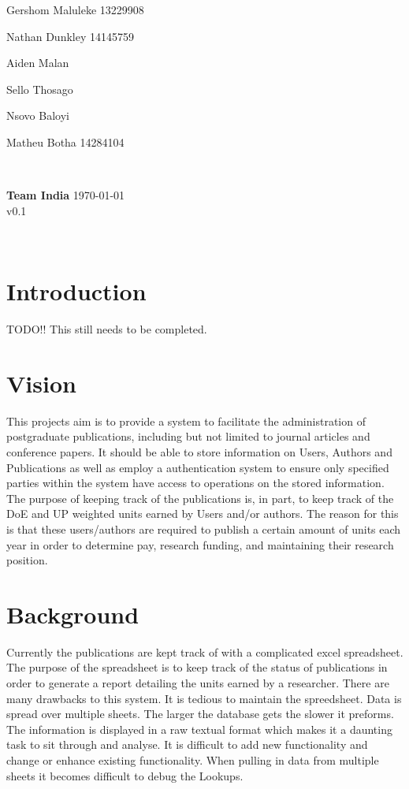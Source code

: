 \documentclass{article}
\begin{document}
\begin{titlepage}
\begin{minipage}{0.5\textwidth}
\begin{flushleft}
	Gershom Maluleke 13229908


	Nathan Dunkley 14145759

	Aiden Malan

	Sello Thosago

	Nsovo Baloyi

	Matheu Botha 14284104
	\end{flushleft}
	\end{minipage}
	~
	\begin{minipage}{0.4\textwidth}
	\begin{flushright} \large
	{ \huge \bfseries Team India }%
	{\large \today}\\
	{\large v0.1}
	\end{flushright}
	\end{minipage}\\[4cm]
\end{titlepage}


	\newpage
	
	\section{Introduction}
	
	TODO!! This still needs to be completed.

	\section{Vision}

	This projects aim is to provide a system to facilitate the administration of postgraduate publications, including but not limited to journal articles and conference papers. It should be able to store information on Users, Authors and Publications as well as employ a authentication system to ensure only specified parties within the system have access to operations on the stored information.
	The purpose of keeping track of the publications is, in part, to keep track of the DoE and UP weighted units earned by Users and/or authors. The reason for this is that these users/authors are required to publish a certain amount of units each year in order to determine pay, research funding, and maintaining their research position.

	\section{Background}
	Currently the publications are kept track of with a complicated excel spreadsheet. The purpose of the spreadsheet is to keep track of the status of publications in order to generate a report detailing the units earned by a researcher. There are many drawbacks to this system. It is tedious to maintain the spreedsheet. Data is spread over multiple sheets. The larger the database gets the slower it preforms. The information is displayed in a raw textual format which makes it a daunting task to sit through and analyse. It is difficult to add new functionality and change or enhance existing functionality. When pulling in data from multiple sheets it becomes difficult to debug the Lookups.
\end{document}
